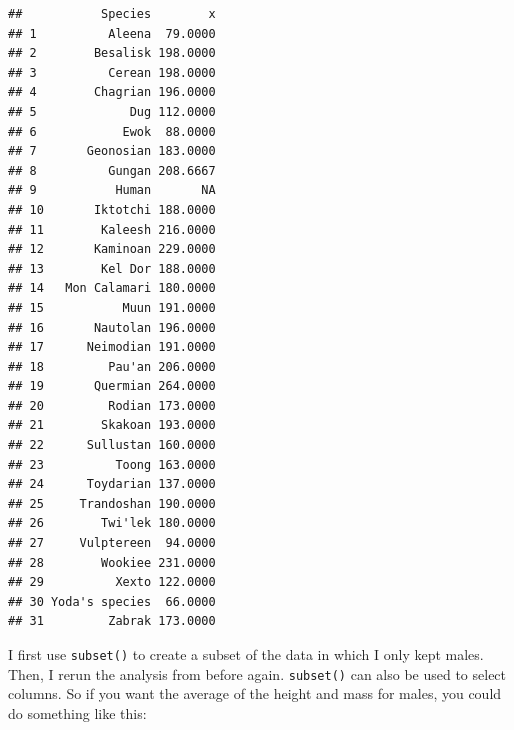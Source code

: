 \documentclass[]{gitbook}
\newenvironment{Shaded}{\begin{snugshade}}{\end{snugshade}}
\newcommand{\DataTypeTok}[1]{\textcolor[rgb]{0.13,0.29,0.53}{#1}}
\newcommand{\KeywordTok}[1]{\textcolor[rgb]{0.13,0.29,0.53}{\textbf{#1}}}
\newcommand{\NormalTok}[1]{#1}
\newcommand{\OperatorTok}[1]{\textcolor[rgb]{0.81,0.36,0.00}{\textbf{#1}}}
\newcommand{\StringTok}[1]{\textcolor[rgb]{0.31,0.60,0.02}{#1}}
\begin{document}
\begin{verbatim}
##           Species        x
## 1          Aleena  79.0000
## 2        Besalisk 198.0000
## 3          Cerean 198.0000
## 4        Chagrian 196.0000
## 5             Dug 112.0000
## 6            Ewok  88.0000
## 7       Geonosian 183.0000
## 8          Gungan 208.6667
## 9           Human       NA
## 10       Iktotchi 188.0000
## 11        Kaleesh 216.0000
## 12       Kaminoan 229.0000
## 13        Kel Dor 188.0000
## 14   Mon Calamari 180.0000
## 15           Muun 191.0000
## 16       Nautolan 196.0000
## 17      Neimodian 191.0000
## 18         Pau'an 206.0000
## 19       Quermian 264.0000
## 20         Rodian 173.0000
## 21        Skakoan 193.0000
## 22      Sullustan 160.0000
## 23          Toong 163.0000
## 24      Toydarian 137.0000
## 25     Trandoshan 190.0000
## 26        Twi'lek 180.0000
## 27     Vulptereen  94.0000
## 28        Wookiee 231.0000
## 29          Xexto 122.0000
## 30 Yoda's species  66.0000
## 31         Zabrak 173.0000
\end{verbatim}

I first use \texttt{subset()} to create a subset of the data in which I only kept males. Then, I rerun
the analysis from before again. \texttt{subset()} can also be used to select columns. So if you want
the average of the height and mass for males, you could do something like this:

\begin{Shaded}
\end{Shaded}
\end{document}
